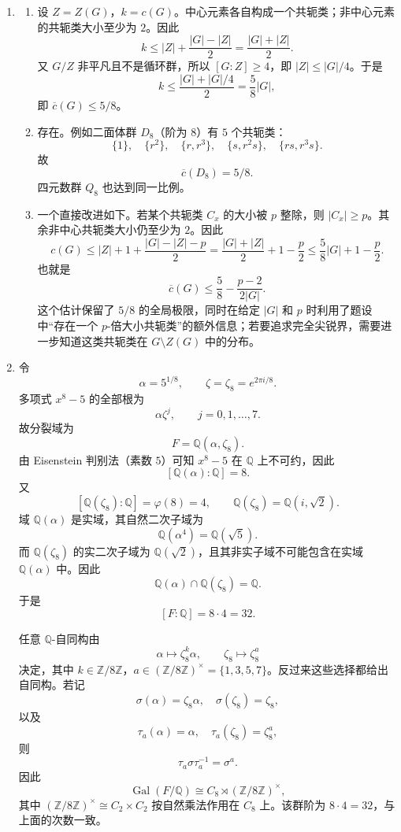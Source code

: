 \documentclass[UTF8,12pt]{ctexart}
\begin{document}
\begin{enumerate}[label=\textbf{\arabic*.},leftmargin=2.2em]
\item
\begin{enumerate}[label=\textbf{(\alph*)},leftmargin=2.4em]
\item 设 \(Z=Z(G)\)，\(k=c(G)\)。中心元素各自构成一个共轭类；非中心元素的共轭类大小至少为 \(2\)。因此
\[
k\le |Z|+\frac{|G|-|Z|}{2}
=\frac{|G|+|Z|}{2}.
\]
又 \(G/Z\) 非平凡且不是循环群，所以 \([G:Z]\ge4\)，即 \(|Z|\le |G|/4\)。于是
\[
k\le \frac{|G|+|G|/4}{2}=\frac58|G|,
\]
即 \(\overline c(G)\le5/8\)。
\item 存在。例如二面体群 \(D_8\)（阶为 \(8\)）有 \(5\) 个共轭类：
\[
\{1\},\quad \{r^2\},\quad \{r,r^3\},\quad \{s,r^2s\},\quad \{rs,r^3s\}.
\]
故
\[
\overline c(D_8)=5/8.
\]
四元数群 \(Q_8\) 也达到同一比例。
\item 一个直接改进如下。若某个共轭类 \(C_x\) 的大小被 \(p\) 整除，则 \(|C_x|\ge p\)。其余非中心共轭类大小仍至少为 \(2\)。因此
\[
c(G)\le |Z|+1+\frac{|G|-|Z|-p}{2}
=\frac{|G|+|Z|}{2}+1-\frac p2
\le \frac58|G|+1-\frac p2.
\]
也就是
\[
\overline c(G)\le \frac58-\frac{p-2}{2|G|}.
\]
这个估计保留了 \(5/8\) 的全局极限，同时在给定 \(|G|\) 和 \(p\) 时利用了题设中“存在一个 \(p\)-倍大小共轭类”的额外信息；若要追求完全尖锐界，需要进一步知道这类共轭类在 \(G\setminus Z(G)\) 中的分布。
\end{enumerate}

\item 令
\[
\alpha=5^{1/8},\qquad \zeta=\zeta_8=e^{2\pi i/8}.
\]
多项式 \(x^8-5\) 的全部根为
\[
\alpha\zeta^j,\qquad j=0,1,\ldots,7.
\]
故分裂域为
\[
F=\mathbb Q(\alpha,\zeta_8).
\]
由 Eisenstein 判别法（素数 \(5\)）可知 \(x^8-5\) 在 \(\mathbb Q\) 上不可约，因此
\[
[\mathbb Q(\alpha):\mathbb Q]=8.
\]
又
\[
[\mathbb Q(\zeta_8):\mathbb Q]=\varphi(8)=4,
\qquad
\mathbb Q(\zeta_8)=\mathbb Q(i,\sqrt2).
\]
域 \(\mathbb Q(\alpha)\) 是实域，其自然二次子域为
\[
\mathbb Q(\alpha^4)=\mathbb Q(\sqrt5).
\]
而 \(\mathbb Q(\zeta_8)\) 的实二次子域为 \(\mathbb Q(\sqrt2)\)，且其非实子域不可能包含在实域 \(\mathbb Q(\alpha)\) 中。因此
\[
\mathbb Q(\alpha)\cap\mathbb Q(\zeta_8)=\mathbb Q.
\]
于是
\[
[F:\mathbb Q]=8\cdot4=32.
\]

任意 \(\mathbb Q\)-自同构由
\[
\alpha\mapsto \zeta_8^k\alpha,\qquad
\zeta_8\mapsto \zeta_8^a
\]
决定，其中 \(k\in\mathbb Z/8\mathbb Z\)，\(a\in(\mathbb Z/8\mathbb Z)^\times=\{1,3,5,7\}\)。反过来这些选择都给出自同构。若记
\[
\sigma(\alpha)=\zeta_8\alpha,\quad \sigma(\zeta_8)=\zeta_8,
\]
以及
\[
\tau_a(\alpha)=\alpha,\quad \tau_a(\zeta_8)=\zeta_8^a,
\]
则
\[
\tau_a\sigma\tau_a^{-1}=\sigma^a.
\]
因此
\[
\operatorname{Gal}(F/\mathbb Q)
\cong C_8\rtimes(\mathbb Z/8\mathbb Z)^\times,
\]
其中 \((\mathbb Z/8\mathbb Z)^\times\cong C_2\times C_2\) 按自然乘法作用在 \(C_8\) 上。该群阶为 \(8\cdot4=32\)，与上面的次数一致。


\end{enumerate}
\end{document}
